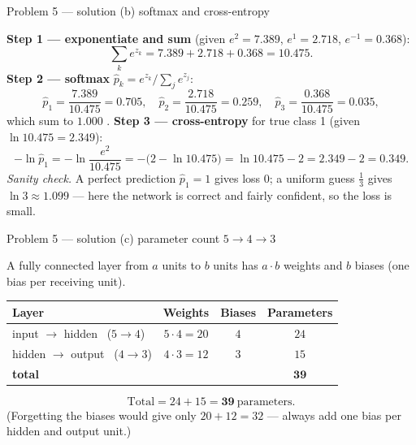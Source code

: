 \documentclass[aspectratio=169,11pt]{beamer}
\begin{document}
\begin{frame}{Problem 5 --- solution (b) softmax and cross-entropy}
  \begin{solutionbox}
    \textbf{Step 1 --- exponentiate and sum} (given $e^{2}=7.389$, $e^{1}=2.718$,
    $e^{-1}=0.368$):
    \[
      \textstyle\sum_k e^{z_k}=7.389+2.718+0.368=10.475 .
    \]
    \textbf{Step 2 --- softmax} $\hat p_k=e^{z_k}\big/\sum_j e^{z_j}$:
    \[
      \hat p_1=\frac{7.389}{10.475}=\mathbf{0.705},\quad
      \hat p_2=\frac{2.718}{10.475}=\mathbf{0.259},\quad
      \hat p_3=\frac{0.368}{10.475}=\mathbf{0.035},
    \]
    which sum to $1.000$ \checkmark.
    \textbf{Step 3 --- cross-entropy} for true class 1 (given $\ln10.475=2.349$):
    \[
      -\ln\hat p_1=-\ln\frac{e^{2}}{10.475}=-\bigl(2-\ln10.475\bigr)=\ln10.475-2=2.349-2=\mathbf{0.349}.
    \]
    \emph{Sanity check.} A perfect prediction $\hat p_1=1$ gives loss $0$; a uniform guess
    $\tfrac13$ gives $\ln3\approx1.099$ --- here the network is correct and fairly confident, so
    the loss is small.
  \end{solutionbox}
\end{frame}

\begin{frame}{Problem 5 --- solution (c) parameter count $5\to4\to3$}
  \begin{solutionbox}
    A fully connected layer from $a$ units to $b$ units has $a\cdot b$ weights and $b$ biases
    (one bias per receiving unit).
    \begin{center}
    \begin{tabular}{@{}lccc@{}}
      \toprule
      Layer & Weights & Biases & Parameters\\
      \midrule
      input $\to$ hidden \ ($5\to4$) & $5\cdot 4=20$ & $4$ & $24$\\
      hidden $\to$ output \ ($4\to3$) & $4\cdot 3=12$ & $3$ & $15$\\
      \midrule
      \textbf{total} & & & $\mathbf{39}$\\
      \bottomrule
    \end{tabular}
    \end{center}
    \[
      \text{Total}=24+15=\mathbf{39}\ \text{parameters.}
    \]
    (Forgetting the biases would give only $20+12=32$ --- always add one bias per hidden and
    output unit.)
  \end{solutionbox}
\end{frame}
\end{document}
